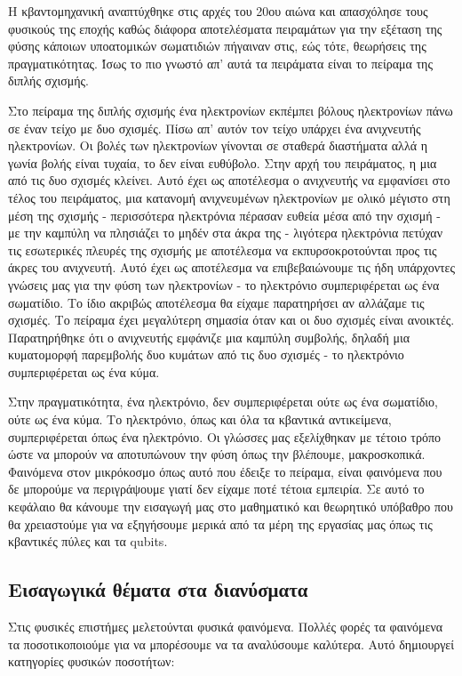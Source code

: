 Η κβαντομηχανική αναπτύχθηκε στις αρχές του 20ου αιώνα και απασχόλησε τους φυσικούς της εποχής καθώς διάφορα
αποτελέσματα πειραμάτων για την εξέταση της φύσης κάποιων υποατομικών σωματιδιών πήγαιναν  στις,
εώς τότε, θεωρήσεις της πραγματικότητας. Ίσως το πιο γνωστό απ' αυτά τα πειράματα είναι το πείραμα της διπλής
σχισμής.

Στο πείραμα της διπλής σχισμής ένα  ηλεκτρονίων εκπέμπει βόλους ηλεκτρονίων πάνω σε έναν τείχο
με δυο σχισμές. Πίσω απ' αυτόν τον τείχο υπάρχει ένα ανιχνευτής ηλεκτρονίων. Οι βολές των ηλεκτρονίων γίνονται
σε σταθερά διαστήματα αλλά η γωνία βολής είναι τυχαία, το  δεν είναι ευθύβολο. Στην αρχή του πειράματος,
η μια από τις δυο σχισμές κλείνει. Αυτό έχει ως αποτέλεσμα ο ανιχνευτής να εμφανίσει στο τέλος του πειράματος, μια
κατανομή ανιχνευμένων ηλεκτρονίων με ολικό μέγιστο στη μέση της σχισμής - περισσότερα ηλεκτρόνια πέρασαν ευθεία μέσα
από την σχισμή - με την καμπύλη να πλησιάζει το μηδέν στα άκρα της - λιγότερα ηλεκτρόνια πετύχαν τις εσωτερικές πλευρές
της σχισμής με αποτέλεσμα να εκπυρσοκροτούνται προς τις άκρες του ανιχνευτή. Αυτό έχει ως αποτέλεσμα να επιβεβαιώνουμε
τις ήδη υπάρχοντες γνώσεις μας για την φύση των ηλεκτρονίων - το ηλεκτρόνιο συμπεριφέρεται ως ένα σωματίδιο. Το ίδιο ακριβώς
αποτέλεσμα θα είχαμε παρατηρήσει αν αλλάζαμε τις σχισμές. Το πείραμα έχει μεγαλύτερη σημασία όταν και οι δυο σχισμές
είναι ανοικτές. Παρατηρήθηκε ότι ο ανιχνευτής εμφάνιζε μια καμπύλη συμβολής, δηλαδή μια κυματομορφή παρεμβολής δυο κυμάτων
από τις δυο σχισμές - το ηλεκτρόνιο συμπεριφέρεται ως ένα κύμα.

Στην πραγματικότητα, ένα ηλεκτρόνιο, δεν συμπεριφέρεται ούτε ως ένα σωματίδιο, ούτε ως ένα κύμα. Το ηλεκτρόνιο, όπως και
όλα τα κβαντικά αντικείμενα, συμπεριφέρεται όπως ένα ηλεκτρόνιο. Οι γλώσσες μας εξελίχθηκαν με τέτοιο τρόπο ώστε να μπορούν
να αποτυπώνουν την φύση όπως την βλέπουμε, μακροσκοπικά. Φαινόμενα στον μικρόκοσμο όπως αυτό που έδειξε το πείραμα, είναι
φαινόμενα που δε μπορούμε να περιγράψουμε γιατί δεν είχαμε ποτέ τέτοια εμπειρία. Σε αυτό το κεφάλαιο θα κάνουμε την εισαγωγή
μας στο μαθηματικό και θεωρητικό υπόβαθρο που θα χρειαστούμε για να εξηγήσουμε μερικά από τα μέρη της εργασίας μας όπως
τις κβαντικές πύλες και τα qubits.

\subsection{Εισαγωγικά θέματα στα διανύσματα}
Στις φυσικές επιστήμες μελετούνται φυσικά φαινόμενα. Πολλές φορές τα φαινόμενα τα ποσοτικοποιούμε για να μπορέσουμε να τα
αναλύσουμε καλύτερα. Αυτό δημιουργεί κατηγορίες φυσικών ποσοτήτων:

